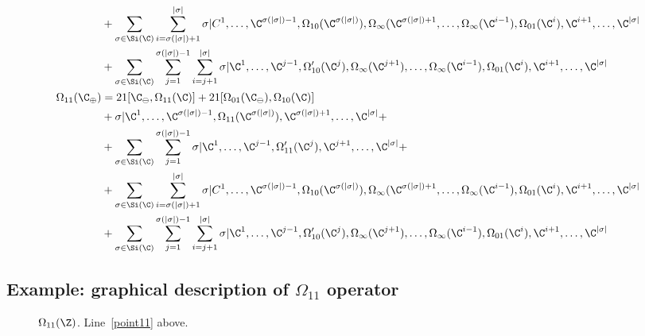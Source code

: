 \begin{align}
                    &+\sum_{\sigma \in \Si(\C)}\sum_{i=\sigma(|\sigma|)+1}^{|\sigma|}\sigma\vert{C^1,\ldots,\C^{\sigma(|\sigma|)-1},\Omega_{10}(\C^{\sigma(|\sigma|)}), \Omega_\infty(\C^{\sigma(|\sigma|)+1},\ldots,\Omega_\infty(\C^{i-1}),\Omega_{01}(\C^i),\C^{i+1},\ldots,\C^{|\sigma|}}\notag\\
                    &+\sum_{\sigma \in \Si(\C)}\sum_{j=1}^{\sigma(|\sigma|)-1}\sum_{i=j+1}^{|\sigma|}\sigma\vert{\C^1,\ldots,\C^{j-1},\Omega'_{10}(\C^j),\Omega_\infty(\C^{j+1}),\ldots,\Omega_\infty(\C^{i-1}),\Omega_{01}(\C^i),\C^{i+1},\ldots,\C^{|\sigma|}}\notag\\
  \Omega_{11}(\C_\oplus) &= 21[\C_\ominus,\Omega_{11}(\C)] + 21[\Omega_{01}(\C_\ominus),\Omega_{10}(\C)]\notag\\
  &+ \sigma\vert{\C^{1},\ldots,\C^{\sigma(|\sigma|)-1},\Omega_{11}(\C^{\sigma(|\sigma|)}),\C^{\sigma(|\sigma|)+1},\ldots,\C^{|\sigma|}} +\notag\\
                    &+ \sum_{\sigma \in \Si(\C)}\sum_{j=1}^{\sigma(|\sigma|)-1}\sigma\vert{\C^{1},\ldots,\C^{j-1},\Omega'_{11}(\C^{j}),\C^{j+1},\ldots,\C^{|\sigma|}} +\notag\\
                    &+\sum_{\sigma \in \Si(\C)}\sum_{i=\sigma(|\sigma|)+1}^{|\sigma|}\sigma\vert{C^1,\ldots,\C^{\sigma(|\sigma|)-1},\Omega_{10}(\C^{\sigma(|\sigma|)}), \Omega_\infty(\C^{\sigma(|\sigma|)+1},\ldots,\Omega_\infty(\C^{i-1}),\Omega_{01}(\C^i),\C^{i+1},\ldots,\C^{|\sigma|}}\notag\\
                    &+\sum_{\sigma \in \Si(\C)}\sum_{j=1}^{\sigma(|\sigma|)-1}\sum_{i=j+1}^{|\sigma|}\sigma\vert{\C^1,\ldots,\C^{j-1},\Omega'_{10}(\C^j),\Omega_\infty(\C^{j+1}),\ldots,\Omega_\infty(\C^{i-1}),\Omega_{01}(\C^i),\C^{i+1},\ldots,\C^{|\sigma|}}\notag\\
\end{align}


\subsection{Example: graphical description of $\Omega_{11}$ operator}

\begin{figure}[ht]
  \centering
  \caption{$\Omega_{11}(\Z)$. Line~\eqref{point11} above.}
\end{figure}



